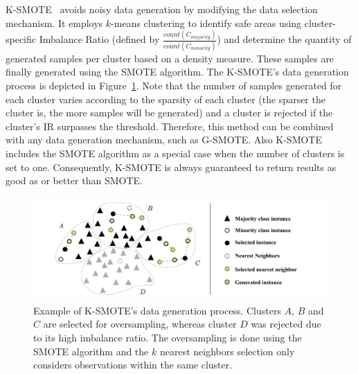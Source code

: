 \documentclass[remotesensing,article,submit,moreauthors,pdftex]{Definitions/mdpi}
\begin{document}
\begin{paracol}{2}
K-SMOTE~\cite{Douzas2018} avoids noisy data generation by modifying the data
selection mechanism. It employs $k$-means clustering to identify safe areas
using cluster-specific Imbalance Ratio (defined by
$\frac{count(C_{majority})}{count(C_{minority})}$) and determine the quantity of
generated samples per cluster based on a density measure. These samples are
finally generated using the SMOTE algorithm. The K-SMOTE's data generation
process is depicted in Figure~\ref{fig:kmeans_smote_example}. Note that the
number of samples generated for each cluster varies according to the sparsity of
each cluster (the sparser the cluster is, the more samples will be generated)
and a cluster is rejected if the cluster's IR surpasses the threshold.
Therefore, this method can be combined with any data generation mechanism, such
as G-SMOTE. Also K-SMOTE includes the SMOTE algorithm as a special case when the
number of clusters is set to one. Consequently, K-SMOTE is always guaranteed to
return results as good as or better than SMOTE.

\end{paracol}
\begin{figure}[H]
	\centering
	\includegraphics[width=1\linewidth]{../analysis/kmeans_smote_example}
	\caption{Example of K-SMOTE's data generation process. Clusters $A$,
		$B$ and $C$ are selected for
		oversampling, whereas cluster $D$ was rejected due to its
		high imbalance ratio. The oversampling is done using the SMOTE algorithm and
		the $k$ nearest neighbors selection only considers
		observations within the same cluster.}
	\label{fig:kmeans_smote_example}
\end{figure}
\end{document}
